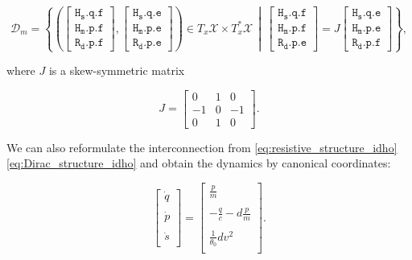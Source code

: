 \documentclass[
	parskip, 			   %
	twoside, 			   %
	DIV=14, 			   %
	BCOR=15.0mm, 		   %
	headsepline, 		   %
	open=right, 		   %
	captions=tableheading, %
	bibliography=totoc,    %
	numbers=noenddot       %
]{scrreprt}
\begin{document}
\begin{equation}
    \label{eq:Dirac_structure_idho}
    \mathcal{D}_m=\left\{ \left( \left[\begin{array}{l}\mathtt{H_{s}.q.f} \\ \mathtt{H_{m}.p.f} \\ \hline \mathtt{R_{d}.p.f} \end{array} \right], \left[\begin{array}{l} \mathtt{H_{s}.q.e} \\ \mathtt{H_{m}.p.e} \\ \hline \mathtt{R_{d}.p.e} \end{array}\right] \right) \in T_{x}\mathcal{X} \times T_{x}^{*}\mathcal{X}    \,\middle\vert\,    \left[\begin{array}{l}\mathtt{H_{s}.q.f} \\ \mathtt{H_{m}.p.f} \\ \hline \mathtt{R_{d}.p.e}\end{array}\right]=J\left[\begin{array}{l}\mathtt{H_{s}.q.e} \\ \mathtt{H_{m}.p.e} \\ \hline \mathtt{R_{d}.p.f} \end{array}\right]\right\},
\end{equation}

where $J$ is a skew-symmetric matrix

\begin{equation}
    \label{eq:skew-symmetric_matrix_idho}
    J = 
    \left[\begin{array}{rr|r}
    0 & 1 & 0 \\
    -1 & 0 & -1 \\
    \hline 0 & 1 & 0
    \end{array}\right].
\end{equation}

We can also reformulate the interconnection from \ref{eq:resistive_structure_idho} \ref{eq:Dirac_structure_idho} and obtain the dynamics by canonical coordinates:

\begin{equation}
    \label{eq:ODE_isothermal_damped_harmonic_oscillator}
    \begin{bmatrix}
    \dot{q}\\
    \\
    \dot{p}\\
    \\
    \dot{s}\\
    \end{bmatrix}
    =
    \begin{bmatrix}
    \frac{p}{m}\\
    \\
    -\frac{q}{c}-d\frac{p}{m}\\
    \\
    \frac{1}{\theta_{0}} d v^2\\
    \end{bmatrix}.
\end{equation}
\end{document}
